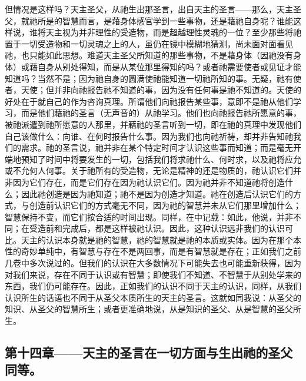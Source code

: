 但情况是这样吗？天主圣父，从祂生出那圣言，出自天主的圣言——那么，天主圣父，就祂所是的智慧而言，是藉身体感官学到一些事物，还是藉祂自身呢？谁能这样说，谁将天主视为并非理性的受造物，而是超越理性灵魂的一位？至少那些将祂置于一切受造物和一切灵魂之上的人，虽仍在镜中模糊地猜测，尚未面对面看见祂，也只能如此思想。难道天主圣父所知道的那些事物，不是藉身体（因祂没有身体）或藉自身从别处得知，而是从某位那里得知的吗？或者祂需要使者或见证才能知道吗？当然不是；因为祂自身的圆满使祂能知道一切祂所知的事。无疑，祂有使者，天使；但并非向祂报告祂不知道的事，因为没有任何事是祂不知道的。天使的好处在于就自己的作为咨询真理。所谓他们向祂报告某些事，意即不是祂从他们学习，而是他们藉祂的圣言（无声音的）从祂学习。他们也向祂报告祂所愿意的事，被祂派遣到祂所愿意的人那里，并藉祂的圣言听到一切，即在祂的真理中发现他们自己该做什么：向谁、在何时报告什么事。因为我们也向祂祈祷，却并非告知祂我们的需求。祂的圣言说，祂并非在某个特定时间才认识这些事而知道；而是毫无开端地预知了时间中将要发生的一切，包括我们将求祂什么、何时求，以及祂将应允或不允何人何事。关于祂所有的受造物，无论是精神的还是物质的，祂认识它们并非因为它们存在，而是它们存在因为祂认识它们。因为祂并非不知道祂将创造什么；因此祂创造是因为祂知道；祂不是因为创造才知道。祂在创造后认识它们的方式，与创造前认识它们的方式毫无不同，因为祂的智慧并未从它们那里增加什么；智慧保持不变，而它们按合适的时间出现。同样，在中记载：如此，他说，并非不同；在受造前和完成后，都是这样被祂认识。因此，这种认识远非我们的认识可比。天主的认识本身就是祂的智慧，祂的智慧就是祂的本质或实体。因为在那个本性的奇妙单纯中，有智慧与存在不是两回事，而是有智慧就是存在；正如我们之前几卷中多次说过的。但我们的认识在大多数情况下可能失去也可能重新获得，因为对我们来说，存在不同于认识或有智慧；即使我们不知道、不智慧于从别处学来的东西，我们仍可能存在。因此，正如我们的认识不同于天主的认识，同样，从我们认识所生的话语也不同于从圣父本质所生的天主的圣言。这就如同我说：从圣父的知识、从圣父的智慧所生；或者更准确地说，从是知识的圣父、从是智慧的圣父所生。\par


\subsection{第十四章——天主的圣言在一切方面与生出祂的圣父同等。}

